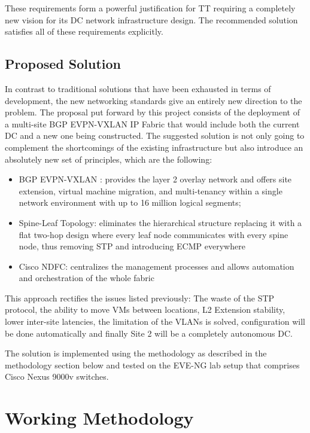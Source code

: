 These requirements form a powerful justification for TT requiring a completely new vision for its DC network infrastructure design. The recommended solution satisfies all of these requirements explicitly.

\subsection{Proposed Solution}
In contrast to traditional solutions that have been exhausted in terms of development, the new networking standards give an entirely new direction to the problem. The proposal put forward by this project consists of the deployment of a multi-site BGP EVPN-VXLAN IP Fabric that would include both the current DC and a new one being constructed. The suggested solution is not only going to complement the shortcomings of the existing infrastructure but also introduce an absolutely new set of principles, which are the following:
\begin{itemize}
    \item BGP EVPN-VXLAN : provides the layer 2 overlay network and offers site extension, virtual machine migration, and multi-tenancy within a single network environment with up to 16 million logical segments;
    \item Spine-Leaf Topology: eliminates the hierarchical structure replacing it with a flat two-hop design where every leaf node communicates with every spine node, thus removing STP and introducing ECMP everywhere
    \item Cisco NDFC: centralizes the management processes and allows automation and orchestration of the whole fabric
\end{itemize}
This approach rectifies the issues listed previously: The waste of the STP protocol, the ability to move VMs between locations, L2 Extension stability, lower inter-site latencies, the limitation of the VLANs is solved, configuration will be done automatically and finally Site 2 will be a completely autonomous DC.

The solution is implemented using the methodology as described in the methodology section below and tested on the EVE-NG lab setup that comprises Cisco Nexus 9000v switches.

\section{Working Methodology}
